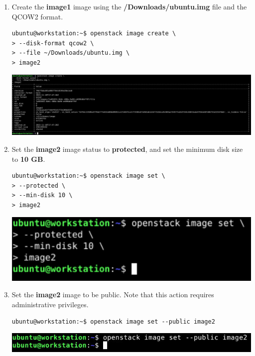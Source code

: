 \documentclass[letterpaper, 12pt]{article}
\begin{document}
\begin{enumerate}
    \item Create the \textbf{image1} image using the \textbf{\texttildemid/Downloads/ubuntu.img} file and the QCOW2
    format.
\begin{lstlisting}
ubuntu@workstation:~$ openstack image create \
> --disk-format qcow2 \
> --file ~/Downloads/ubuntu.img \
> image2
\end{lstlisting}

    \begin{center}
        \includegraphics[width=\linewidth]{images/part1/step13.png}
    \end{center}

    \item Set the \textbf{image2} image status to \textbf{protected}, and set the minimum disk size to \textbf{10 GB}.
\begin{lstlisting}
ubuntu@workstation:~$ openstack image set \
> --protected \
> --min-disk 10 \
> image2
\end{lstlisting}

    \begin{center}
        \includegraphics[width=\linewidth]{images/part1/step14.png}
    \end{center}

    \item Set the \textbf{image2} image to be public. Note that this action requires administrative privileges.
\begin{lstlisting}
ubuntu@workstation:~$ openstack image set --public image2
\end{lstlisting}

    \begin{center}
        \includegraphics[width=\linewidth]{images/part1/step15.png}
    \end{center}


\end{enumerate}
\end{document}
